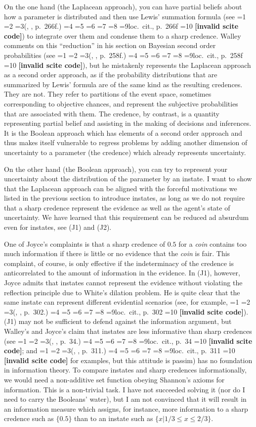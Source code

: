 \documentclass[journal]{IEEEtran}
\newcommand{\qeins}[1]{``#1''}
\newif\ifNumericalOrYear
\newcommand{\PageP}{p.~}
\newcommand{\PageP}{}
\newcommand{\scite}[3]{\ifnum#1=1\ifNumericalOrYear\citep{#2}\else\citeyearpar{#2}\fi\else
\ifnum#1=2\ifNumericalOrYear\citep[#3]{#2}\else\citep[{\PageP}#3]{#2}\fi\else
\ifnum#1=3\ifNumericalOrYear(\citet[#3]{#2})\else(\citeauthor{#2}, \citeyear{#2}, {\PageP}#3.)\fi\else
\ifnum#1=4\ifNumericalOrYear\citet{#2}\else\citet{#2}\fi\else
\ifnum#1=5\ifNumericalOrYear(\citet{#2})\else\citep{#2}\fi\else
\ifnum#1=6\ifNumericalOrYear(\citet[#3]{#2})\else\citep[{\PageP}#3]{#2}\fi\else
\ifnum#1=7\ifNumericalOrYear\citep{#2}\else\citealp{#2}\fi\else
\ifnum#1=8\ifNumericalOrYear\citep[#3]{#2}\else\citealp[{\PageP}#3]{#2}\fi\else
\ifnum#1=9\ifNumericalOrYear\citep[#3]{#2}\else{}loc.\ cit., {\PageP}#3\fi\else
\ifnum#1=10\ifNumericalOrYear\citep{#2}\else\citeyear{#2}\fi\else
\textbf{[invalid scite code]}\fi\fi\fi\fi\fi\fi\fi\fi\fi\fi}
\begin{document}
On the one hand (the Laplacean approach), you can have partial beliefs
about how a parameter is distributed and then use Lewis' summation
formula (see \scite{8}{lewis81}{266f}) to integrate over them and
condense them to a sharp credence. Walley comments on this
\qeins{reduction} in his section on Bayesian second order
probabilities (see \scite{8}{walley91}{258f}), but he mistakenly
represents the Laplacean approach as a second order approach, as if
the probability distributions that are summarized by Lewis' formula
are of the same kind as the resulting credences. They are not. They
refer to partitions of the event space, sometimes corresponding to
objective chances, and represent the subjective probabilities that are
associated with them. The credence, by contrast, is a quantity
representing partial belief and assisting in the making of decisions
and inferences. It is the Boolean approach which has elements of a
second order approach and thus makes itself vulnerable to regress
problems by adding another dimension of uncertainty to a parameter
(the credence) which already represents uncertainty.

On the other hand (the Boolean approach), you can try to represent
your uncertainty about the distribution of the parameter by an
instate. I want to show that the Laplacean approach can be aligned
with the forceful motivations we listed in the previous section to
introduce instates, as long as we do not require that a sharp credence
represent the evidence as well as the agent's state of uncertainty. We
have learned that this requirement can be reduced ad absurdum even for
instates, see (J1) and (J2).

One of Joyce's complaints is that a sharp credence of $0.5$ for a
\textit{coin} contains too much information if there is little or no
evidence that the \textit{coin} is fair. This complaint, of course, is
only effective if the indeterminacy of the credence is anticorrelated
to the amount of information in the evidence. In (J1), however, Joyce
admits that instates cannot represent the evidence without violating
the reflection principle due to White's dilation problem. He is quite
clear that the same instate can represent different evidential
scenarios (see, for example, \scite{8}{joyce10}{302}). (J1) may not be
sufficient to defend against the information argument, but Walley's
and Joyce's claim that instates are less informative than sharp
credences (see \scite{8}{walley91}{34}; and \scite{8}{joyce10}{311}
for examples, but this attitude is passim) has no foundation in
information theory. To compare instates and sharp credences
informationally, we would need a non-additive set function obeying
Shannon's axioms for information. This is a non-trivial task. I have
not succeeded solving it (nor do I need to carry the Booleans' water),
but I am not convinced that it will result in an information measure
which assigns, for instance, more information to a sharp credence such
as $\{0.5\}$ than to an instate such as $\{x|1/3\leq{}x\leq{}2/3\}$.
\end{document}
